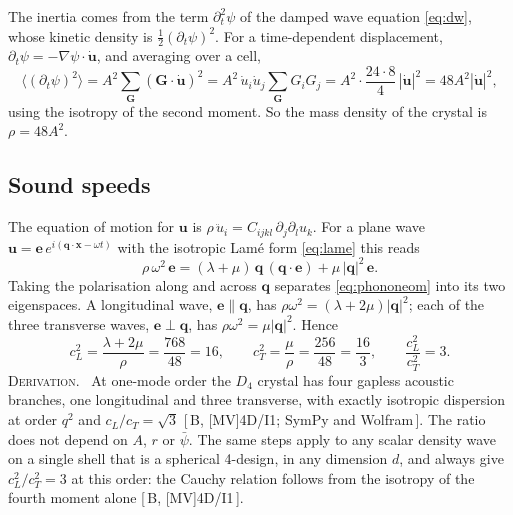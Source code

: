 \documentclass[a4paper,11pt]{article}
\makeatletter
\numberwithin{equation}{section}
\theoremstyle{jsplain}
\theoremstyle{jsrem}
\newcommand{\lbl}[1]{\textcolor{lbl@#1}{\textsc{#1}}.\ }
\newcommand{\grade}[1]{[\,#1\,]}
\makeatother
\begin{document}
The inertia comes from the term $\partial_t^2\psi$ of the damped wave equation \eqref{eq:dw}, whose kinetic density is $\tfrac12(\partial_t\psi)^2$. For a time-dependent displacement, $\partial_t\psi=-\nabla\psi\cdot\dot{\mathbf{u}}$, and averaging over a cell,
\[
\langle(\partial_t\psi)^2\rangle=A^2\sum_{\mathbf{G}}(\mathbf{G}\cdot\dot{\mathbf{u}})^2=A^2\,\dot u_i\dot u_j\sum_{\mathbf{G}}G_iG_j=A^2\cdot\frac{24\cdot8}{4}\,|\dot{\mathbf{u}}|^2=48A^2|\dot{\mathbf{u}}|^2,
\]
using the isotropy of the second moment. So the mass density of the crystal is $\rho=48A^2$.

\subsection{Sound speeds}

The equation of motion for $\mathbf{u}$ is $\rho\,\ddot u_i=C_{ijkl}\,\partial_j\partial_lu_k$. For a plane wave $\mathbf{u}=\mathbf{e}\,e^{i(\mathbf{q}\cdot\mathbf{x}-\omega t)}$ with the isotropic Lamé form \eqref{eq:lame} this reads
\begin{equation}\label{eq:phononeom}
\rho\,\omega^2\,\mathbf{e}=(\lambda+\mu)\,\mathbf{q}\,(\mathbf{q}\cdot\mathbf{e})+\mu\,|\mathbf{q}|^2\,\mathbf{e}.
\end{equation}
Taking the polarisation along and across $\mathbf{q}$ separates \eqref{eq:phononeom} into its two eigenspaces. A longitudinal wave, $\mathbf{e}\parallel\mathbf{q}$, has $\rho\omega^2=(\lambda+2\mu)|\mathbf{q}|^2$; each of the three transverse waves, $\mathbf{e}\perp\mathbf{q}$, has $\rho\omega^2=\mu|\mathbf{q}|^2$. Hence
\begin{equation}\label{eq:speeds}
c_L^2=\frac{\lambda+2\mu}{\rho}=\frac{768}{48}=16,\qquad c_T^2=\frac{\mu}{\rho}=\frac{256}{48}=\frac{16}{3},\qquad \frac{c_L^2}{c_T^2}=3 .
\end{equation}
\lbl{Derivation} At one-mode order the $D_4$ crystal has four gapless acoustic branches, one longitudinal and three transverse, with exactly isotropic dispersion at order $q^2$ and $c_L/c_T=\sqrt3$ \grade{B, [MV]4D/I1; SymPy and Wolfram}. The ratio does not depend on $A$, $r$ or $\bar\psi$. The same steps apply to any scalar density wave on a single shell that is a spherical 4-design, in any dimension $d$, and always give $c_L^2/c_T^2=3$ at this order: the Cauchy relation follows from the isotropy of the fourth moment alone \grade{B, [MV]4D/I1}.
\end{document}

